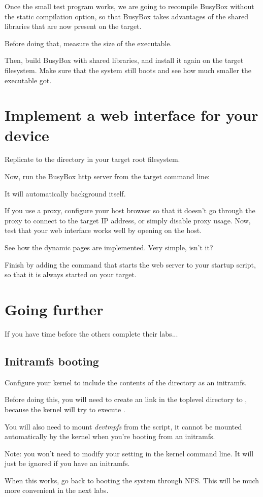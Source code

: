 Once the small test program works, we are going to recompile BusyBox
without the static compilation option, so that BusyBox takes
advantages of the shared libraries that are now present on the target.

Before doing that, measure the size of the  executable.

Then, build BusyBox with shared libraries, and install it again on the
target filesystem. Make sure that the system still boots and see how
much smaller the  executable got.

\section{Implement a web interface for your device}

Replicate  to the  directory in your target
root filesystem.

Now, run the BusyBox http server from the target command line:


It will automatically background itself.

If you use a proxy, configure your host browser so that it doesn't go
through the proxy to connect to the target IP address, or simply
disable proxy usage.  Now, test that your web interface works well by
opening  on the host.

See how the dynamic pages are implemented. Very simple, isn't it?

Finish by adding the command that starts the web server to your
startup script, so that it is always started on your target.

\section{Going further}

If you have time before the others complete their labs...

\subsection{Initramfs booting}

Configure your kernel to include the contents of the 
directory as an initramfs.

Before doing this, you will need to create an  link in the
toplevel directory to , because the kernel will try to
execute .

You will also need to mount {\em devtmpfs} from the  script,
it cannot be mounted automatically by the kernel when you're booting
from an initramfs.

Note: you won't need to modify your  setting in the kernel
command line. It will just be ignored if you have an initramfs.

When this works, go back to booting the system through NFS.
This will be much more convenient in the next labs.
